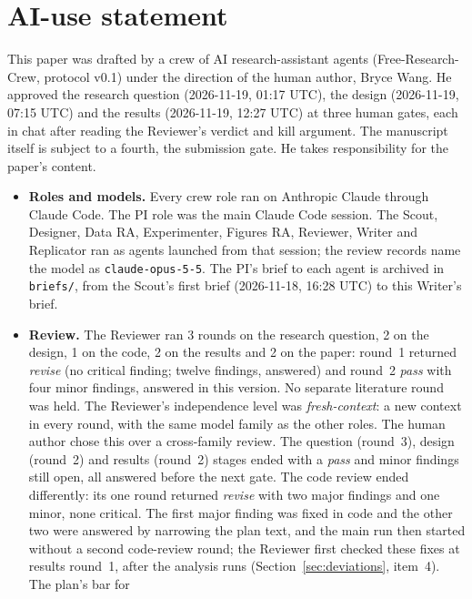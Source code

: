 \section*{AI-use statement}

This paper was drafted by a crew of AI research-assistant agents
(Free-Research-Crew, protocol v0.1) under the direction of the human author, Bryce Wang.
He approved the research question (2026-11-19, 01:17 UTC), the design (2026-11-19, 07:15 UTC)
and the results (2026-11-19, 12:27 UTC) at three human gates, each in chat after reading the
Reviewer's verdict and kill argument. The manuscript itself is subject to a fourth, the
submission gate. He takes responsibility for the paper's content.

\begin{itemize}
  \item \textbf{Roles and models.} Every crew role ran on Anthropic Claude through Claude
        Code. The PI role was the main Claude Code session. The Scout, Designer, Data RA,
        Experimenter, Figures RA, Reviewer, Writer and Replicator ran as agents launched from that
        session; the review records name the model as \texttt{claude-opus-5-5}. The PI's
        brief to each agent is archived in \texttt{briefs/}, from the Scout's first brief
        (2026-11-18, 16:28 UTC) to this Writer's brief.
  \item \textbf{Review.} The Reviewer ran 3 rounds on the research question, 2 on the
        design, 1 on the code, 2 on the results and 2 on the paper: round~1 returned \emph{revise} (no critical
        finding; twelve findings, answered) and round~2 \emph{pass} with four minor findings,
        answered in this version. No separate
        literature round was held. The Reviewer's independence level was
        \emph{fresh-context}: a new context in every round, with the same model family as the
        other roles. The human author chose this over a cross-family review. The question
        (round~3), design (round~2) and results (round~2) stages ended with a \emph{pass} and
        minor findings still open, all answered before the next gate. The code review ended
        differently: its one round returned \emph{revise} with two major findings and one
        minor, none critical. The first major finding was fixed in code and the other two
        were answered by narrowing the plan text, and the main run then started without a
        second code-review round; the Reviewer first checked these fixes at results round~1,
        after the analysis runs (Section~\ref{sec:deviations}, item~4). The plan's bar for

\end{itemize}
